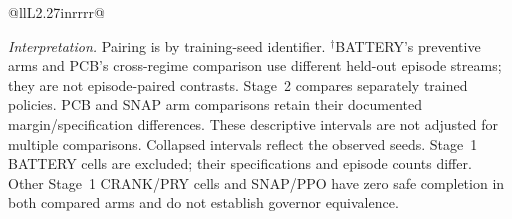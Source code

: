 \begin{table}[tp]
\begin{tabular}{@{}llL{2.27in}rrrr@{}}
\bottomrule
\end{tabular}
\par\smallskip
\begin{minipage}{\linewidth}
\footnotesize
\textit{Interpretation.} Pairing is by training-seed identifier.
$^{\dagger}$BATTERY's preventive arms and PCB's cross-regime comparison use
different held-out episode streams; they are not episode-paired contrasts.
Stage~2 compares separately trained policies. PCB and SNAP arm comparisons
retain their documented margin/specification differences.
These descriptive intervals are not adjusted for multiple comparisons.
Collapsed intervals reflect the observed seeds. Stage~1 BATTERY cells are excluded;
their specifications and episode counts differ. Other Stage~1 CRANK/PRY cells
and SNAP/PPO have zero safe completion in both compared arms and do not
establish governor equivalence.
\end{minipage}
\endgroup
\end{table}

